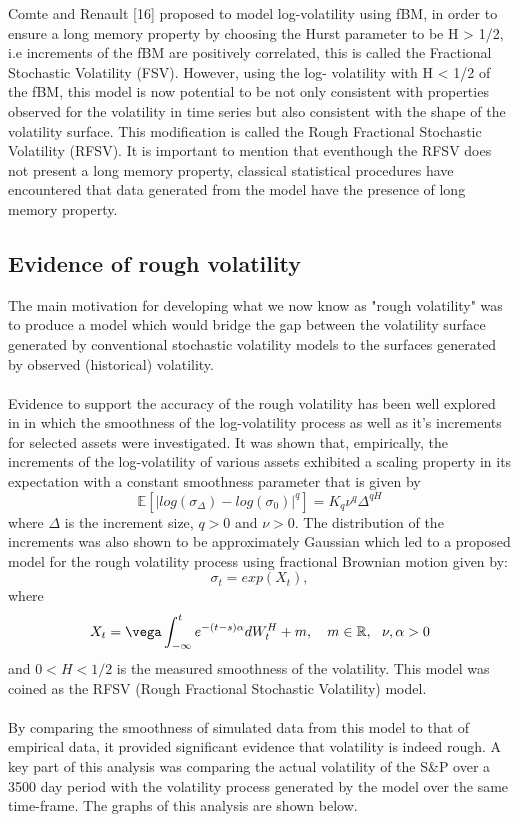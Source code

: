 \documentclass[12pt,oneside]{article}
\begin{document}
Comte and Renault [16] proposed to model log-volatility using fBM, in order to ensure a long memory property by choosing the Hurst parameter to be H > 1/2, i.e increments of the fBM are positively correlated, this is called the Fractional Stochastic Volatility (FSV). However, using the log- volatility with H < 1/2 of the fBM, this model is now potential to be not only consistent with properties observed for the volatility in time series but also consistent with the shape of the volatility surface. This modification is called the Rough Fractional Stochastic Volatility (RFSV). It is important to mention that eventhough the RFSV does not present a long memory property, classical statistical procedures have encountered that data generated from the model have the presence of long memory property.


\subsection{Evidence of rough volatility}
\label{sec:rough_vol_evidence}
The main motivation for developing what we now know as "rough volatility" was to produce a model which would bridge the gap between the volatility surface generated by conventional stochastic volatility models to the surfaces generated by observed (historical) volatility. 
\\
\\
Evidence to support the accuracy of the rough volatility  has been well explored in \cite{BlackScholesOR, Gatheral2014} in which the smoothness of the log-volatility process as well as it's increments for selected assets were investigated. It was shown that, empirically, the increments of the log-volatility of various assets exhibited a scaling property in its expectation with a constant smoothness parameter that is given by $$\mathbb{E}[|log(\sigma_\Delta)-log(\sigma_0)|^q]=K_q\nu^q\Delta^{qH}$$ where $\Delta$ is the increment size, $q>0$ and $\nu>0$. The distribution of the increments was also shown to be approximately Gaussian which led to a proposed model for the rough volatility process using fractional Brownian motion given by: $$\sigma_t = exp(X_t),$$ where $$X_t=\vega\int_{-\infty}^t e^{-(t-s)\alpha}dW_t^H+m, \ \ \ m\in\mathbb{R}, \ \  \nu, \alpha>0$$ and $0<H<1/2$ is the measured smoothness of the volatility. This model was coined as the RFSV (Rough Fractional Stochastic Volatility) model. 
\\
\\
By comparing the smoothness of simulated data from this model to that of empirical data, it provided significant evidence that volatility is indeed rough. A key part of this analysis was comparing the actual volatility of the S\&P over a 3500 day period with the volatility process generated by the model over the same time-frame. The graphs of this analysis are shown below.
\end{document}

